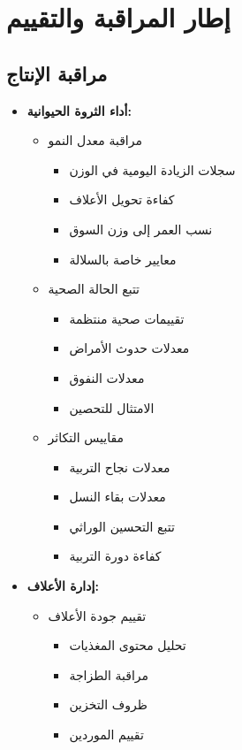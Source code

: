 \section{إطار المراقبة والتقييم}

\subsection{مراقبة الإنتاج}
\begin{itemize}
    \item \textbf{أداء الثروة الحيوانية:}
    \begin{itemize}
        \item مراقبة معدل النمو
        \begin{itemize}
            \item سجلات الزيادة اليومية في الوزن
            \item كفاءة تحويل الأعلاف
            \item نسب العمر إلى وزن السوق
            \item معايير خاصة بالسلالة
        \end{itemize}
        
        \item تتبع الحالة الصحية
        \begin{itemize}
            \item تقييمات صحية منتظمة
            \item معدلات حدوث الأمراض
            \item معدلات النفوق
            \item الامتثال للتحصين
        \end{itemize}
        
        \item مقاييس التكاثر
        \begin{itemize}
            \item معدلات نجاح التربية
            \item معدلات بقاء النسل
            \item تتبع التحسين الوراثي
            \item كفاءة دورة التربية
        \end{itemize}
    \end{itemize}
    
    \item \textbf{إدارة الأعلاف:}
    \begin{itemize}
        \item تقييم جودة الأعلاف
        \begin{itemize}
            \item تحليل محتوى المغذيات
            \item مراقبة الطزاجة
            \item ظروف التخزين
            \item تقييم الموردين
        \end{itemize}
        

\end{itemize}
\end{itemize}
